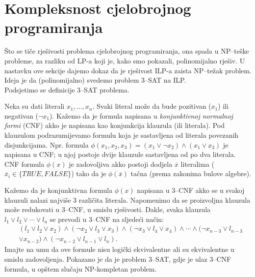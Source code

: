 \documentclass[a4paper, utf8, 11pt, colorlinks]{book}
\begin{document}
 \section{Kompleksnost cjelobrojnog programiranja}
   Što se tiče rješivosti problema cjelobrojnog programiranja, ona spada u NP--teške probleme, za razliku od LP-a koji je, kako smo pokazali, polinomijalno rješiv. U nastavku ove sekcije dajemo dokaz da je rješivost ILP-a zaista NP--težak problem.  Ideja je da (polinomijalno) svedemo problem 3--SAT na ILP.\\ 
   Podsjetimo se definicije 3--SAT problema. 
   
   Neka su dati literali $x_1, \ldots, x_n$. Svaki literal može da bude pozitivan ($x_1$) ili negativan  ($\neg x_1$). Kažemo da je formula napisana u \emph{konjunktivnoj normalnoj formi} (CNF) akko je napisana kao konjunkcija klauzula (ili literala). Pod klauzulom podrazumijevamo formulu koja je sastavljena od literala povezanih disjunkcijama. Npr. formula $\phi(x_1, x_2, x_3)= (x_1 \vee  \neg x_2) \wedge (x_1 \vee x_3)$ je napisana u CNF; u njoj postoje dvije klauzule sastavljena od po dva literala. CNF formula $\phi(x)$ je zadovoljiva akko postoji dodjela $\overline{x}$ literalima ($\overline{x}_i \in \{TRUE, FALSE\}$) tako da je $\phi(\overline{x})$ tačna (prema zakonima bulove algebre).  
   
   Kažemo da je konjunktivna formula $\phi(x)$  napisana u 3--CNF  akko se u svakoj klauzuli nalazi najviše 3 različita literala. Napomenimo da se proizvoljna klauzula može redukovati u 3--CNF, u smislu rješivosti. Dakle, svaka klauzula 
   $l_1 \vee l_2 \vee \cdots \vee l_n$ se prevodi u 3--CNF na sljedeći način:
   \begin{align*}
       &(l_1 \vee l_2 \vee x_2) \wedge ( \neg x_2 \vee l_3 \vee x_3) \wedge ( \neg x_3 \vee l_4 \vee x_4 ) \wedge \cdots \wedge (\neg x_{n-3} \vee l_{n-3} \\
       &\vee x_{n-2} ) \wedge ( \neg x_{n-2} \vee l_{n-1} \vee l_n ).  
    \end{align*}    
      Imajte na umu da ove formule nisu logički ekvivalentne ali su ekvivalentne u smislu zadovoljenja. 
    Pokazano je da je problem 3--SAT, gdje je ulaz 3--CNF formula,  u opštem slučaju NP-kompletan problem.  
    
\end{document}
